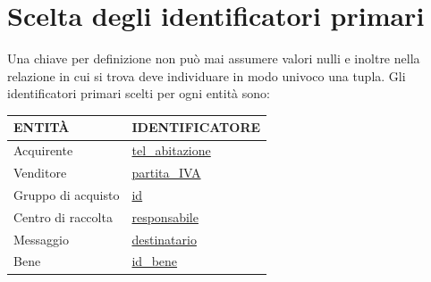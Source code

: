 \documentclass[a4paper, 10pt]{report}
\begin{document}
\section{Scelta degli identificatori primari}
Una chiave per definizione non pu\`o mai assumere valori nulli e inoltre nella relazione in cui si trova deve individuare in modo univoco una tupla. Gli identificatori primari scelti per ogni entit\`a sono:\\
\begin{table}[h!]
\centering
\begin{tabular}{|l|l|}
\hline
\textbf{ENTIT\`A}& \textbf{IDENTIFICATORE}\\
\hline
Acquirente & \underline{tel\_abitazione}\\
\hline
Venditore & \underline{partita\_IVA}\\
\hline
Gruppo di acquisto & \underline{id}\\
\hline
Centro di raccolta & \underline{responsabile}\\
\hline
Messaggio & \underline{destinatario}\\
\hline
Bene & \underline{id\_bene} \\
\hline
\end{tabular}
\end{table}
\end{document}
